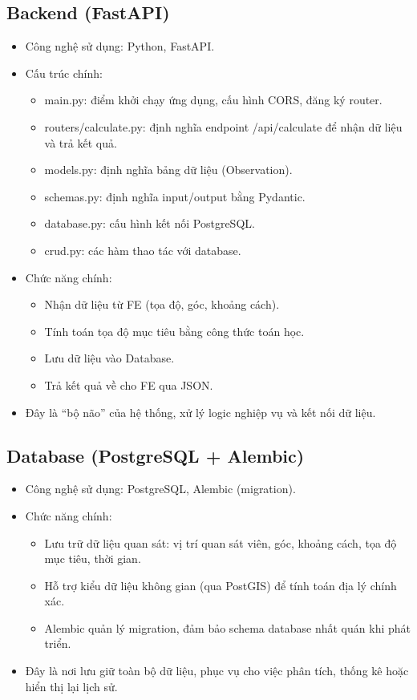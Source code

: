 \subsection{Backend (FastAPI)}
\begin{itemize}
    \item Công nghệ sử dụng: Python, FastAPI.
    \item Cấu trúc chính:
    \begin{itemize}
        \item main.py: điểm khởi chạy ứng dụng, cấu hình CORS, đăng ký router.
        \item routers/calculate.py: định nghĩa endpoint /api/calculate để nhận dữ liệu và trả kết quả.
        \item models.py: định nghĩa bảng dữ liệu (Observation).
        \item schemas.py: định nghĩa input/output bằng Pydantic.
        \item database.py: cấu hình kết nối PostgreSQL.
        \item crud.py: các hàm thao tác với database.
    \end{itemize}
    \item Chức năng chính:
    \begin{itemize}
        \item Nhận dữ liệu từ FE (tọa độ, góc, khoảng cách).
        \item Tính toán tọa độ mục tiêu bằng công thức toán học.
        \item Lưu dữ liệu vào Database.
        \item Trả kết quả về cho FE qua JSON.
    \end{itemize}
    \item Đây là “bộ não” của hệ thống, xử lý logic nghiệp vụ và kết nối dữ liệu.
\end{itemize}

\subsection{Database (PostgreSQL + Alembic)}
\begin{itemize}
    \item Công nghệ sử dụng: PostgreSQL, Alembic (migration).
    \item Chức năng chính:
    \begin{itemize}
        \item Lưu trữ dữ liệu quan sát: vị trí quan sát viên, góc, khoảng cách, tọa độ mục tiêu, thời gian.
        \item Hỗ trợ kiểu dữ liệu không gian (qua PostGIS) để tính toán địa lý chính xác.
        \item Alembic quản lý migration, đảm bảo schema database nhất quán khi phát triển.
    \end{itemize}
    \item Đây là nơi lưu giữ toàn bộ dữ liệu, phục vụ cho việc phân tích, thống kê hoặc hiển thị lại lịch sử.
\end{itemize}

